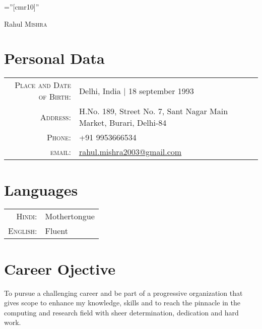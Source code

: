 \documentclass[a4paper,10pt]{article}
\begin{document}
\pagestyle{empty} %

\font\fb=''[cmr10]'' %

\par{\centering
		{\Huge Rahul \textsc{Mishra}
	}\bigskip\par}

\section{Personal Data}

\begin{tabular}{rl}
    \textsc{Place and Date of Birth:} & Delhi, India  | 18 september 1993 \\
    \textsc{Address:}   & H.No. 189, Street No. 7, Sant Nagar Main Market, Burari, Delhi-84 \\
    \textsc{Phone:}     & +91 9953666534\\
    \textsc{email:}     & \href{mailto:rahul.mishra2003@gmail.com}{rahul.mishra2003@gmail.com}
\end{tabular}


\section{Languages}
\begin{tabular}{rl}
 \textsc{Hindi:}&Mothertongue\\
\textsc{English:}&Fluent\\
\end{tabular}



\section{Career Ojective}
\begin{flushleft}
To pursue a challenging career and be part of a progressive organization that gives scope to enhance my knowledge, skills and to reach the pinnacle in the computing and research field with sheer determination, dedication and hard work.
\end{flushleft}


\end{document}
